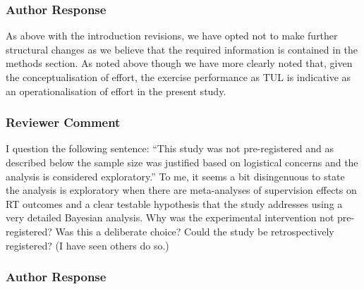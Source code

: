 \documentclass[
  letterpaper,
  DIV=11,
  numbers=noendperiod]{scrartcl}
\begin{document}
\hypertarget{author-response-5}{%
\subsubsection{Author Response}\label{author-response-5}}

As above with the introduction revisions, we have opted not to make
further structural changes as we believe that the required information
is contained in the methods section. As noted above though we have more
clearly noted that, given the conceptualisation of effort, the exercise
performance as TUL is indicative as an operationalisation of effort in
the present study.

\hypertarget{reviewer-comment-6}{%
\subsubsection{Reviewer Comment}\label{reviewer-comment-6}}

I question the following sentence: ``This study was not pre-registered
and as described below the sample size was justified based on logistical
concerns and the analysis is considered exploratory.'' To me, it seems a
bit disingenuous to state the analysis is exploratory when there are
meta-analyses of supervision effects on RT outcomes and a clear testable
hypothesis that the study addresses using a very detailed Bayesian
analysis. Why was the experimental intervention not pre-registered? Was
this a deliberate choice? Could the study be retrospectively registered?
(I have seen others do so.)

\hypertarget{author-response-6}{%
\subsubsection{Author Response}\label{author-response-6}}
\end{document}
